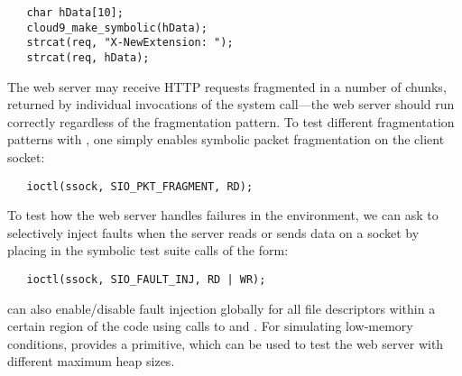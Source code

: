 \begin{verbatim}
   char hData[10];
   cloud9_make_symbolic(hData);
   strcat(req, "X-NewExtension: ");
   strcat(req, hData);
\end{verbatim}

The web server may receive HTTP requests fragmented in a number of chunks, returned by individual invocations of the  system call---the web server should run correctly regardless of the fragmentation pattern.  To test different fragmentation patterns with \cnine, one simply enables symbolic packet fragmentation on the client socket:
\begin{verbatim}
   ioctl(ssock, SIO_PKT_FRAGMENT, RD);
\end{verbatim}

To test how the web server handles failures in the environment, we can ask \cnine to selectively inject faults when the server reads or sends data on a socket by placing in the symbolic test suite calls of the form:
\begin{verbatim}
   ioctl(ssock, SIO_FAULT_INJ, RD | WR);
\end{verbatim}
\cnine can also enable/disable fault injection globally for all file descriptors within a certain region of the code using calls to  and . For simulating low-memory conditions, \cnine provides a  primitive, which can be used to test the web server with different maximum heap sizes.

